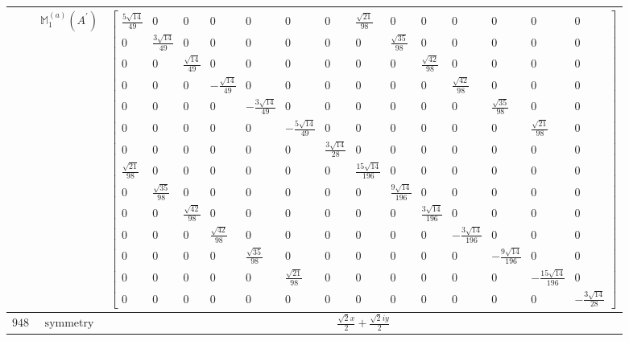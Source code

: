 \documentclass[fleqn,8pt,landscape]{jsarticle}
\begin{document}
\begin{longtable}{ccc}
$  $ & $ \mathbb{M}_{1}^{(a)}(A^{\prime}) $ & $ \begin{bmatrix} \frac{5 \sqrt{14}}{49} & 0 & 0 & 0 & 0 & 0 & 0 & \frac{\sqrt{21}}{98} & 0 & 0 & 0 & 0 & 0 & 0 \\ 0 & \frac{3 \sqrt{14}}{49} & 0 & 0 & 0 & 0 & 0 & 0 & \frac{\sqrt{35}}{98} & 0 & 0 & 0 & 0 & 0 \\ 0 & 0 & \frac{\sqrt{14}}{49} & 0 & 0 & 0 & 0 & 0 & 0 & \frac{\sqrt{42}}{98} & 0 & 0 & 0 & 0 \\ 0 & 0 & 0 & - \frac{\sqrt{14}}{49} & 0 & 0 & 0 & 0 & 0 & 0 & \frac{\sqrt{42}}{98} & 0 & 0 & 0 \\ 0 & 0 & 0 & 0 & - \frac{3 \sqrt{14}}{49} & 0 & 0 & 0 & 0 & 0 & 0 & \frac{\sqrt{35}}{98} & 0 & 0 \\ 0 & 0 & 0 & 0 & 0 & - \frac{5 \sqrt{14}}{49} & 0 & 0 & 0 & 0 & 0 & 0 & \frac{\sqrt{21}}{98} & 0 \\ 0 & 0 & 0 & 0 & 0 & 0 & \frac{3 \sqrt{14}}{28} & 0 & 0 & 0 & 0 & 0 & 0 & 0 \\ \frac{\sqrt{21}}{98} & 0 & 0 & 0 & 0 & 0 & 0 & \frac{15 \sqrt{14}}{196} & 0 & 0 & 0 & 0 & 0 & 0 \\ 0 & \frac{\sqrt{35}}{98} & 0 & 0 & 0 & 0 & 0 & 0 & \frac{9 \sqrt{14}}{196} & 0 & 0 & 0 & 0 & 0 \\ 0 & 0 & \frac{\sqrt{42}}{98} & 0 & 0 & 0 & 0 & 0 & 0 & \frac{3 \sqrt{14}}{196} & 0 & 0 & 0 & 0 \\ 0 & 0 & 0 & \frac{\sqrt{42}}{98} & 0 & 0 & 0 & 0 & 0 & 0 & - \frac{3 \sqrt{14}}{196} & 0 & 0 & 0 \\ 0 & 0 & 0 & 0 & \frac{\sqrt{35}}{98} & 0 & 0 & 0 & 0 & 0 & 0 & - \frac{9 \sqrt{14}}{196} & 0 & 0 \\ 0 & 0 & 0 & 0 & 0 & \frac{\sqrt{21}}{98} & 0 & 0 & 0 & 0 & 0 & 0 & - \frac{15 \sqrt{14}}{196} & 0 \\ 0 & 0 & 0 & 0 & 0 & 0 & 0 & 0 & 0 & 0 & 0 & 0 & 0 & - \frac{3 \sqrt{14}}{28} \end{bmatrix} $ \\ \hline
$ 948 $ & $ \text{symmetry} $ & $ \frac{\sqrt{2} x}{2} + \frac{\sqrt{2} i y}{2} $ \\

\end{longtable}
\end{document}
